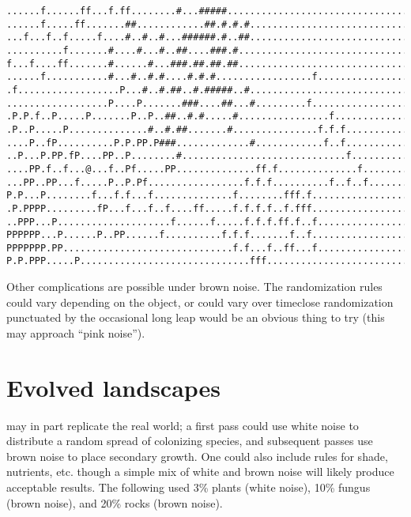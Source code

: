 \documentclass[12pt,a4paper]{article}
\begin{document}
\begin{verbatim}
......f......ff...f.ff........#...#####.................................
......f.....ff.......##............##.#.#.#.............................
...f...f..f.....f....#..#..#...######.#..##.............................
..........f.......#....#...#..##....###.#...............................
f...f....ff.......#......#...###.##.##.##...............................
......f...........#...#..#.#....#.#.#.................f.................
.f..................P...#..#.##..#.#####..#.............................
..................P....P.......###....##...#.........f..................
.P.P.f..P.....P.......P..P..##..#.#.....#................f..............
.P..P.....P..............#..#.##.......#...............f.f.f............
....P..fP..........P.P.PP.P###.............#............f..f............
..P...P.PP.fP....PP..P........#.............................f...........
....PP.f..f...@...f..Pf.....PP..............ff.f..............f.........
...PP..PP...f.....P..P.Pf.................f.f.f..........f..f..f........
P.P...P........f...f.f...f..............f........fff.f..................
.P.PPPP.........fP...f...f..f....ff.....f.f.f.f..f.fff..................
..PPP...P....................f......f.....f.f.f.ff.f..f.................
PPPPPP...P......P..PP......f..........f.f.f.......f..f..................
PPPPPPP.PP..............................f.f...f..ff...f.................
P.P.PPP.....P..............................fff..........................
\end{verbatim}

Other complications are possible under brown noise. The
randomization rules could vary depending on the object, or could
vary over time\textendash close randomization punctuated by the
occasional long leap would be an obvious thing to try (this may
approach ``pink noise'').

\section*{Evolved landscapes}

may in part replicate the real world; a first pass could use white
noise to distribute a random spread of colonizing species, and
subsequent passes use brown noise to place secondary growth. One could
also include rules for shade, nutrients, etc. though a simple mix of
white and brown noise will likely produce acceptable results. The
following used 3\% plants (white noise), 10\% fungus (brown noise), and
20\% rocks (brown noise).
\end{document}
